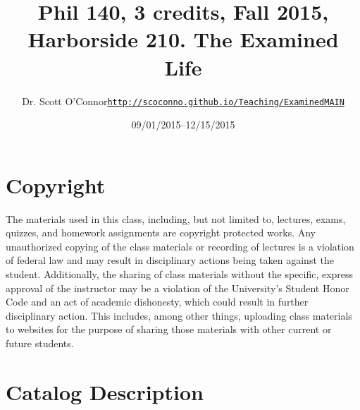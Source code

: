 \documentclass[11pt,article,oneside]{memoir}
\def\myauthor{Author}
\def\mytitle{Title}
\def\mycopyright{\myauthor}
\def\myweb{\href{http://scoconno.github.io/Teaching/ExaminedMAIN}{http://scoconno.github.io/Teaching/ExaminedMAIN}}
\def\myauthor{Dr. Scott O'Connor}
\def\mytitle{{\normalsize Phil 140, 3 credits, Fall 2015, Harborside 210. \newline} \HUGE The Examined Life}
\begin{document}
\setsansfont[Mapping=tex-text]{Georgia} 
\setmonofont[Mapping=tex-text,Scale=0.8]{Georgia} 

\def\ind{\hangindent=1 true cm\hangafter=1 \noindent}
\def\labelitemi{$\cdot$}

\pagestyle{kjh}

\title{\LARGE \mytitle}     
\author{\Large\myauthor \newline \footnotesize\texttt{\noindent\myweb}}
\date{09/01/2015--12/15/2015}

\published{\,}

\maketitle




%
%

\section{Copyright}
The materials used in this class, including, but not limited to, lectures, exams, quizzes, and homework assignments are copyright protected works.  Any unauthorized copying of the class materials or recording of lectures is a violation of federal law and may result in disciplinary actions being taken against the student.  Additionally, the sharing of class materials without the specific, express approval of the instructor may be a violation of the University's Student Honor Code and an act of academic dishonesty, which could result in further disciplinary action.  This includes, among other things, uploading class materials to websites for the purpose of sharing those materials with other current or future students. 

\section{Catalog Description}
\end{document}
